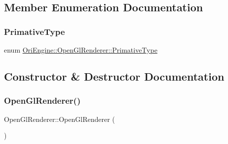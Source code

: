 \subsection{Member Enumeration Documentation}
\hypertarget{class_ori_engine_1_1_open_gl_renderer_a2821e12392e46c549bd42b9951dbcb54}{}\label{class_ori_engine_1_1_open_gl_renderer_a2821e12392e46c549bd42b9951dbcb54} 
\subsubsection{\texorpdfstring{Primative\+Type}{PrimativeType}}
{\footnotesize\ttfamily enum \hyperlink{class_ori_engine_1_1_open_gl_renderer_a2821e12392e46c549bd42b9951dbcb54}{Ori\+Engine\+::\+Open\+Gl\+Renderer\+::\+Primative\+Type}}



\subsection{Constructor \& Destructor Documentation}
\hypertarget{class_ori_engine_1_1_open_gl_renderer_aaa26a72feb4ccee93121b4e296184ef1}{}\label{class_ori_engine_1_1_open_gl_renderer_aaa26a72feb4ccee93121b4e296184ef1} 
\subsubsection{\texorpdfstring{Open\+Gl\+Renderer()}{OpenGlRenderer()}}
{\footnotesize\ttfamily Open\+Gl\+Renderer\+::\+Open\+Gl\+Renderer (\begin{DoxyParamCaption}{ }\end{DoxyParamCaption})}

\hypertarget{class_ori_engine_1_1_open_gl_renderer_a184006c704765da13a684f88b355f693}{}\label{class_ori_engine_1_1_open_gl_renderer_a184006c704765da13a684f88b355f693} 
